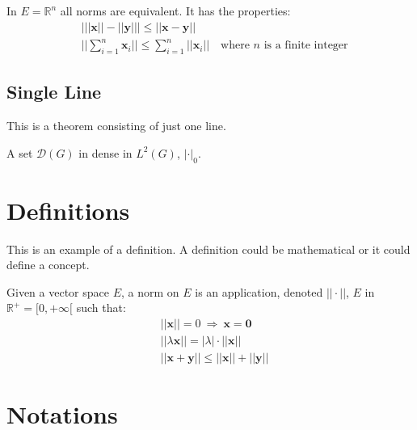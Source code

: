 \documentclass[11pt,twoside]{book} %
\begin{document}
\begin{theorem}
    In $E=\mathbb{R}^n$ all norms are equivalent. It has the properties:
    \begin{align}
         & \big| ||\mathbf{x}|| - ||\mathbf{y}|| \big|\leq || \mathbf{x}- \mathbf{y}||                            \\
         & ||\sum_{i=1}^n\mathbf{x}_i||\leq \sum_{i=1}^n||\mathbf{x}_i||\quad\text{where $n$ is a finite integer}
    \end{align}
\end{theorem}

\subsection{Single Line}
This is a theorem consisting of just one line.

\begin{theorem}
    A set $\mathcal{D}(G)$ in dense in $L^2(G)$, $|\cdot|_0$.
\end{theorem}


\section{Definitions}

This is an example of a definition. A definition could be mathematical or it could define a concept.

\begin{definition}
    Given a vector space $E$, a norm on $E$ is an application, denoted $||\cdot||$, $E$ in $\mathbb{R}^+=[0,+\infty[$ such that:
    \begin{align}
         & ||\mathbf{x}||=0\ \Rightarrow\ \mathbf{x}=\mathbf{0}        \\
         & ||\lambda \mathbf{x}||=|\lambda|\cdot ||\mathbf{x}||        \\
         & ||\mathbf{x}+\mathbf{y}||\leq ||\mathbf{x}||+||\mathbf{y}||
    \end{align}
\end{definition}


\section{Notations}
\end{document}
